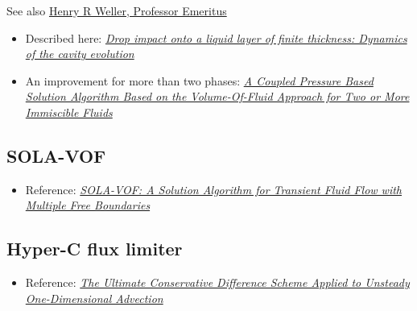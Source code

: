 See also \href{http://fds.duke.edu/db/aas/Physics/weller}{Henry R Weller, Professor Emeritus}


\begin{itemize}
    \item Described here: \textit{\href{http://link.libris.kb.se/sfxliub?sid=?url_ver=Z39.88-2004&rfr_id=info:sid/bibl.liu.se\%3Axerxes+\%28+PubMed+LiU\%29&rft.genre=article&rft_val_fmt=info\%3Aofi\%2Ffmt\%3Akev\%3Amtx\%3Ajournal&rft.issn=15393755&rft.date=2009&rft.jtitle=Phys+Rev+E+Stat+Nonlin+Soft+Matter+Phys&rft.volume=79&rft.issue=3+Pt+2&rft.spage=036306&rft.atitle=Drop+impact+onto+a+liquid+layer+of+finite+thickness+\%3A+dynamics+of+the+cavity+evolution+&rft.aulast=Berberovi\%C4\%87&rft.aufirst=Edin}{Drop impact onto a liquid layer of finite thickness: Dynamics of the cavity evolution}}
    \item An improvement for more than two phases: \textit{\href{http://www.mathematik.uni-ulm.de/numerik/staff/urban/reports/ECCOMASCFD2010paperfinal.pdf}{A Coupled Pressure Based Solution Algorithm Based on the Volume-Of-Fluid Approach for Two or More Immiscible Fluids}}
\end{itemize}

\subsection{SOLA-VOF}

\begin{itemize}
    \item Reference: \textit{\href{http://www.ewp.rpi.edu/hartford/~ernesto/Su2012/CFD/Readings/SOLA-VOF-1980-P1.pdf}{SOLA-VOF: A Solution Algorithm for Transient Fluid Flow with Multiple Free Boundaries}}
\end{itemize}

\subsection{Hyper-C flux limiter}

\begin{itemize}
    \item Reference: \textit{\href{http://www.water.tkk.fi/wr/kurssit/Yhd-12.112/TVD1.pdf}{The Ultimate Conservative Difference Scheme Applied to Unsteady One-Dimensional Advection}}
\end{itemize}

